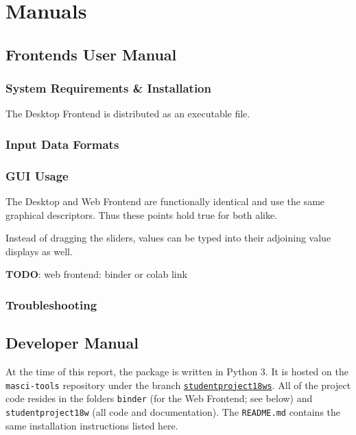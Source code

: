 
\chapter{Manuals}
\label{cha:manuals}

\section{Frontends User Manual}
\label{sec:user-manual}

\subsection{System Requirements \& Installation}
\label{sec:system-requirements}

The Desktop Frontend is distributed as an executable file. 

\subsection{Input Data Formats}
\label{sec:input-data-formats}

\subsection{GUI Usage}
\label{sec:gui-usage}

The Desktop and Web Frontend are functionally identical and use the same
graphical descriptors. Thus these points hold true for both alike.

Instead of dragging the sliders, values can be typed into their adjoining value
displays as well.

\textbf{TODO}: web frontend: binder or colab link

\subsection{Troubleshooting}
\label{sec:troubleshooting}


\section{Developer Manual}
\label{sec:developer-manual}

At the time of this report, the package is written in Python 3. It is hosted on
the \texttt{masci-tools} repository \cite{masci-tools} under the branch
\href{https://github.com/JuDFTteam/masci-tools/tree/studentproject18ws}{\texttt{studentproject18ws}}.
All of the project code resides in the folders \texttt{binder} (for the Web
Frontend; see below) and \texttt{studentproject18w} (all code and
documentation). The \texttt{README.md} contains the same installation
instructions listed here.

